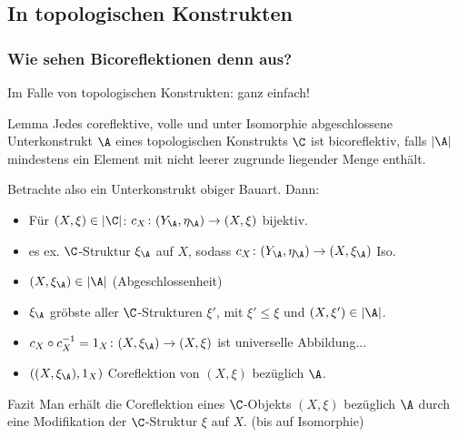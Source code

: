 \subsection{In topologischen Konstrukten}

\begin{frame}
\frametitle{Wie sehen Bicoreflektionen denn aus?}

Im Falle von topologischen Konstrukten: ganz einfach!

  \pause

  \begin{block}{Lemma}
  Jedes coreflektive, volle und unter Isomorphie abgeschlossene Unterkonstrukt $\A$ eines topologischen Konstrukts $\C$ ist bicoreflektiv, falls $|\A|$ mindestens ein Element mit nicht leerer zugrunde liegender Menge enthält.
  \end{block}

  \pause
  Betrachte also ein Unterkonstrukt obiger Bauart. Dann:

  \begin{itemize}
    \item<+-> Für $(X, \xi) \in |\C|$: $c_X \colon (Y_\A, \eta_\A) \to (X, \xi)$ bijektiv.
    \item<+-> es ex. $\C$-Struktur $\xi_\A$ auf $X$, sodass $c_X \colon (Y_\A, \eta_\A) \to (X, \xi_\A)$ Iso.

    \item<+-> $(X, \xi_\A) \in |\A|$ (Abgeschlossenheit)
    \item<+-> $\xi_\A$ gröbste aller $\C$-Strukturen $\xi'$, mit $\xi' \leq \xi$ und $(X, \xi') \in |\A|$.

    \item<+->  $c_X \circ c_X^{-1} = 1_X \colon (X,\xi_\A) \to (X,\xi)$ ist universelle Abbildung...

    \item<+-> $((X,\xi_\A),1_X)$ Coreflektion von $(X,\xi)$ bez\"uglich $\A$.\qedhere

  \end{itemize}

  \pause

  \begin{block}{Fazit}
    Man erhält die Coreflektion eines  $\C$-Objekts $(X,\xi)$ bezüglich $\A$ durch eine Modifikation der $\C$-Struktur $\xi$ auf $X$. (bis auf Isomorphie)
  \end{block}

\end{frame}

